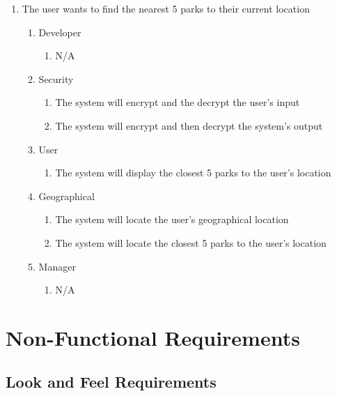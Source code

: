 \documentclass[titlepage]{article}
\begin{document}
\begin{enumerate}[{BE}1.]
    \item The user wants to find the nearest 5 parks to their current location
    \begin{enumerate}[{VP\theenumi}.1]
        \item Developer
            \begin{enumerate}
                \item N/A
            \end{enumerate}
        \item Security
            \begin{enumerate}
                \item The system will encrypt and the decrypt the user's input
                \item The system will encrypt and then decrypt the system's output
            \end{enumerate}
        \item User
            \begin{enumerate}
                \item The system will display the closest 5 parks to the user's location
            \end{enumerate}
        \item Geographical
            \begin{enumerate}
                \item The system will locate the user's geographical location
                \item The system will locate the closest 5 parks to the user's location
            \end{enumerate}
        \item Manager
            \begin{enumerate}
                \item N/A
            \end{enumerate}
    \end{enumerate}


\end{enumerate}

\section{Non-Functional Requirements}%
\label{sec:non-functional_requirements}
\subsection{Look and Feel Requirements}%
\label{sub:look_and_feel_requirements}
\end{document}
